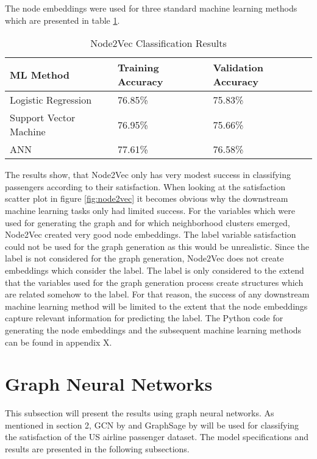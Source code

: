   \noindent The node embeddings were used for three standard machine learning
  methods which are presented in table \ref{table:node2vec_results}.

  \begin{table}[h]
    \centering
    \begin{tabular}{|l||l|l|}
      \hline
      \textbf{ML Method} & \textbf{Training Accuracy} & \textbf{Validation
      Accuracy}\\
      \hline\hline
      Logistic Regression & 76.85\% & 75.83\% \\\hline 
      Support Vector Machine & 76.95\% & 75.66\% \\\hline
      ANN & 77.61\% & 76.58\% \\
      \hline
    \end{tabular}
    \caption{Node2Vec Classification Results}
    \label{table:node2vec_results}
  \end{table}

  \noindent The results show, that Node2Vec only has very modest success in
  classifying passengers according to their satisfaction. When looking at the
  satisfaction scatter plot in figure \ref{fig:node2vec} it becomes obvious why
  the downstream machine learning tasks only had limited success. For the
  variables which were used for generating the graph and for which neighborhood
  clusters emerged, Node2Vec created very good node embeddings. The label
  variable satisfaction could not be used for the graph generation as this would
  be unrealistic. Since the label is not considered for the graph generation,
  Node2Vec does not create embeddings which consider the label. The label is
  only considered to the extend that the variables used for the graph
  generation process create structures which are related somehow to the label.
  For that reason, the success of any downstream machine learning method will
  be limited to the extent that the node embeddings capture relevant information
  for predicting the label. The Python code for generating the node embeddings 
  and the subsequent machine learning methods can be found in appendix X. 

  \section{Graph Neural Networks}

  This subsection will present the results using graph neural networks. As
  mentioned in section 2, GCN by \cite{kipf2016semi} and
  GraphSage by \cite{hamilton2017inductive} will be used for classifying the
  satisfaction of the US airline passenger dataset. The model specifications 
  and results are presented in the following subsections.

